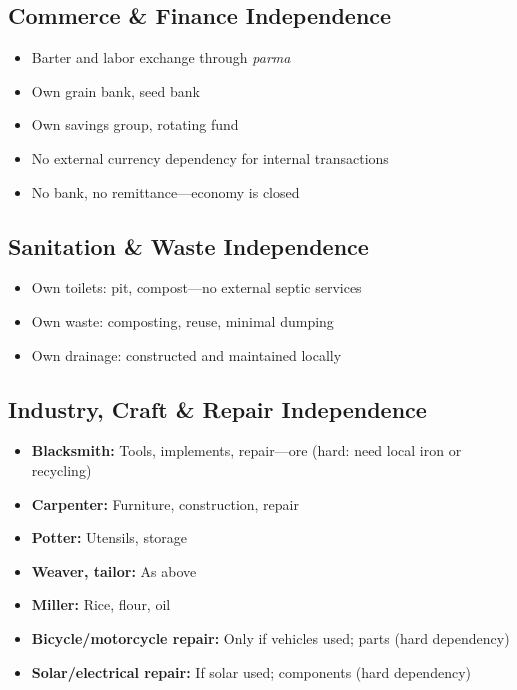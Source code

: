 \documentclass[11pt,a4paper]{article}
\begin{document}
\subsection{Commerce \& Finance Independence}
\begin{itemize}
    \item Barter and labor exchange through \textit{parma}
    \item Own grain bank, seed bank
    \item Own savings group, rotating fund
    \item No external currency dependency for internal transactions
    \item No bank, no remittance---economy is closed
\end{itemize}

\subsection{Sanitation \& Waste Independence}
\begin{itemize}
    \item Own toilets: pit, compost---no external septic services
    \item Own waste: composting, reuse, minimal dumping
    \item Own drainage: constructed and maintained locally
\end{itemize}

\subsection{Industry, Craft \& Repair Independence}
\begin{itemize}
    \item \textbf{Blacksmith:} Tools, implements, repair---ore (hard: need local iron or recycling)
    \item \textbf{Carpenter:} Furniture, construction, repair
    \item \textbf{Potter:} Utensils, storage
    \item \textbf{Weaver, tailor:} As above
    \item \textbf{Miller:} Rice, flour, oil
    \item \textbf{Bicycle/motorcycle repair:} Only if vehicles used; parts (hard dependency)
    \item \textbf{Solar/electrical repair:} If solar used; components (hard dependency)
\end{itemize}
\end{document}
